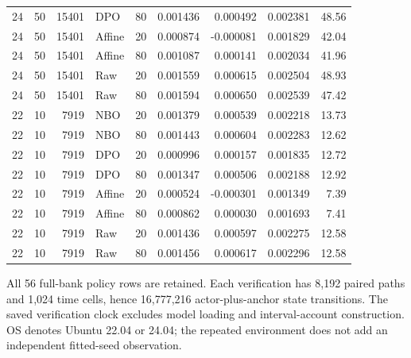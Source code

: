 \begin{longtable}{lrrlrrrrr}
24 & 50 & 15401 & DPO & 80 & 0.001436 & 0.000492 & 0.002381 & 48.56\\
24 & 50 & 15401 & Affine & 20 & 0.000874 & -0.000081 & 0.001829 & 42.04\\
24 & 50 & 15401 & Affine & 80 & 0.001087 & 0.000141 & 0.002034 & 41.96\\
24 & 50 & 15401 & Raw & 20 & 0.001559 & 0.000615 & 0.002504 & 48.93\\
24 & 50 & 15401 & Raw & 80 & 0.001594 & 0.000650 & 0.002539 & 47.42\\
22 & 10 & 7919 & NBO & 20 & 0.001379 & 0.000539 & 0.002218 & 13.73\\
22 & 10 & 7919 & NBO & 80 & 0.001443 & 0.000604 & 0.002283 & 12.62\\
22 & 10 & 7919 & DPO & 20 & 0.000996 & 0.000157 & 0.001835 & 12.72\\
22 & 10 & 7919 & DPO & 80 & 0.001347 & 0.000506 & 0.002188 & 12.92\\
22 & 10 & 7919 & Affine & 20 & 0.000524 & -0.000301 & 0.001349 & 7.39\\
22 & 10 & 7919 & Affine & 80 & 0.000862 & 0.000030 & 0.001693 & 7.41\\
22 & 10 & 7919 & Raw & 20 & 0.001436 & 0.000597 & 0.002275 & 12.58\\
22 & 10 & 7919 & Raw & 80 & 0.001456 & 0.000617 & 0.002296 & 12.58\\
\bottomrule\end{longtable}
\noindent All 56 full-bank policy rows are retained. Each verification has 8,192 paired paths and 1,024 time cells, hence 16,777,216 actor-plus-anchor state transitions. The saved verification clock excludes model loading and interval-account construction. OS denotes Ubuntu 22.04 or 24.04; the repeated environment does not add an independent fitted-seed observation.
\endgroup
